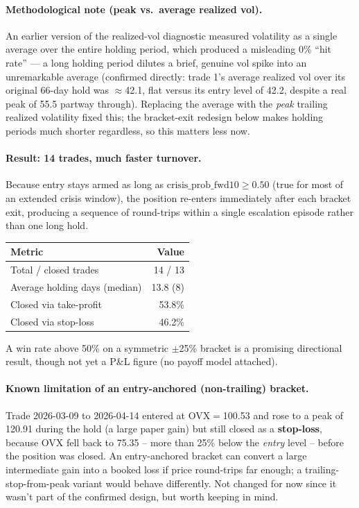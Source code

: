 \documentclass[11pt]{article}
\begin{document}
\paragraph{Methodological note (peak vs.\ average realized vol).} An
earlier version of the realized-vol diagnostic measured volatility as a
single average over the entire holding period, which produced a
misleading 0\% ``hit rate'' --- a long holding period dilutes a brief,
genuine vol spike into an unremarkable average (confirmed directly:
trade 1's average realized vol over its original 66-day hold was
$\approx$42.1, flat versus its entry level of 42.2, despite a real peak of
55.5 partway through). Replacing the average with the \emph{peak} trailing
realized volatility fixed this; the bracket-exit redesign below makes
holding periods much shorter regardless, so this matters less now.

\paragraph{Result: 14 trades, much faster turnover.} Because entry stays
armed as long as $\text{crisis\_prob\_fwd10} \geq 0.50$ (true for most of
an extended crisis window), the position re-enters immediately after each
bracket exit, producing a sequence of round-trips within a single
escalation episode rather than one long hold.

\begin{center}
\begin{tabular}{lr}
\toprule
Metric & Value \\
\midrule
Total / closed trades & 14 / 13 \\
Average holding days (median) & 13.8 (8) \\
Closed via take-profit & 53.8\% \\
Closed via stop-loss & 46.2\% \\
\bottomrule
\end{tabular}
\end{center}

A win rate above 50\% on a symmetric $\pm$25\% bracket is a promising
directional result, though not yet a P\&L figure (no payoff model
attached).

\paragraph{Known limitation of an entry-anchored (non-trailing) bracket.}
Trade 2026-03-09 to 2026-04-14 entered at OVX$=$100.53 and rose to a peak
of 120.91 during the hold (a large paper gain) but still closed as a
\textbf{stop-loss}, because OVX fell back to 75.35 -- more than 25\% below
the \emph{entry} level -- before the position was closed. An
entry-anchored bracket can convert a large intermediate gain into a
booked loss if price round-trips far enough; a trailing-stop-from-peak
variant would behave differently. Not changed for now since it wasn't
part of the confirmed design, but worth keeping in mind.
\end{document}
